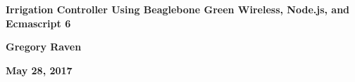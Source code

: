 \thispagestyle{empty}
{\centering\bfseries\color{black}\Huge
Irrigation Controller Using Beaglebone Green Wireless, Node.js, and Ecmascript 6
\par}

\bigskip

\begin{figure}
	\centering
\end{figure}

\bigskip
{\centering\bfseries\Large
Gregory Raven
\par}


\bigskip
{\centering\bfseries\LARGE
May 28, 2017
\par}



